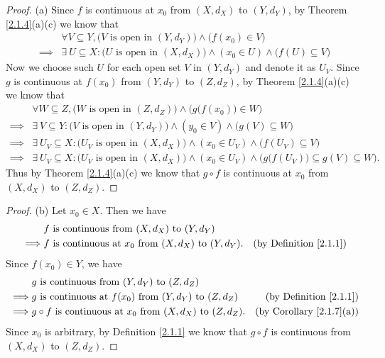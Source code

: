 \begin{proof}{(a)}
    Since \(f\) is continuous at \(x_0\) from \((X, d_X)\) to \((Y, d_Y)\), by Theorem \ref{2.1.4}(a)(c) we know that
    \begin{align*}
                 & \forall V \subseteq Y, \big(V \text{ is open in } (Y, d_Y)\big) \land \big(f(x_0) \in V\big)                         \\
        \implies & \exists\ U \subseteq X : \big(U \text{ is open in } (X, d_X)\big) \land (x_0 \in U) \land \big(f(U) \subseteq V\big)
    \end{align*}
    Now we choose such \(U\) for each open set \(V\) in \((Y, d_Y)\) and denote it as \(U_V\).
    Since \(g\) is continuous at \(f(x_0)\) from \((Y, d_Y)\) to \((Z, d_Z)\), by Theorem \ref{2.1.4}(a)(c) we know that
    \begin{align*}
                 & \forall W \subseteq Z, \big(W \text{ is open in } (Z, d_Z)\big) \land \Big(g\big(f(x_0)\big) \in W\Big)                                                 \\
        \implies & \exists\ V \subseteq Y : \big(V \text{ is open in } (Y, d_Y)\big) \land (y_0 \in V) \land \big(g(V) \subseteq W\big)                                    \\
        \implies & \exists\ U_V \subseteq X : \big(U_V \text{ is open in } (X, d_X)\big) \land (x_0 \in U_V) \land \big(f(U_V) \subseteq V\big)                            \\
        \implies & \exists\ U_V \subseteq X : \big(U_V \text{ is open in } (X, d_X)\big) \land (x_0 \in U_V) \land \Big(g\big(f(U_V)\big) \subseteq g(V) \subseteq W\Big).
    \end{align*}
    Thus by Theorem \ref{2.1.4}(a)(c) we know that \(g \circ f\) is continuous at \(x_0\) from \((X, d_X)\) to \((Z, d_Z)\).
\end{proof}

\begin{proof}{(b)}
    Let \(x_0 \in X\).
    Then we have
    \begin{align*}
                 & f \text{ is continuous from } (X, d_X) \text{ to } (Y, d_Y)                                                       \\
        \implies & f \text{ is continuous at } x_0 \text{ from } (X, d_X) \text{ to } (Y, d_Y). & \text{(by Definition \ref{2.1.1})}
    \end{align*}
    Since \(f(x_0) \in Y\), we have
    \begin{align*}
                 & g \text{ is continuous from } (Y, d_Y) \text{ to } (Z, d_Z)                                                                 \\
        \implies & g \text{ is continuous at } f(x_0) \text{ from } (Y, d_Y) \text{ to } (Z, d_Z)       & \text{(by Definition \ref{2.1.1})}   \\
        \implies & g \circ f \text{ is continuous at } x_0 \text{ from } (X, d_X) \text{ to } (Z, d_Z). & \text{(by Corollary \ref{2.1.7}(a))}
    \end{align*}
    Since \(x_0\) is arbitrary, by Definition \ref{2.1.1} we know that \(g \circ f\) is continuous from \((X, d_X)\) to \((Z, d_Z)\).
\end{proof}

